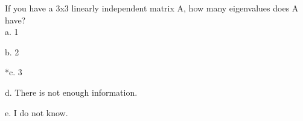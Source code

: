 
If you have a 3x3 linearly independent matrix A, how many eigenvalues does A have? \\

a. 1

b. 2

*c. 3

d. There is not enough information.

e. I do not know.\\
